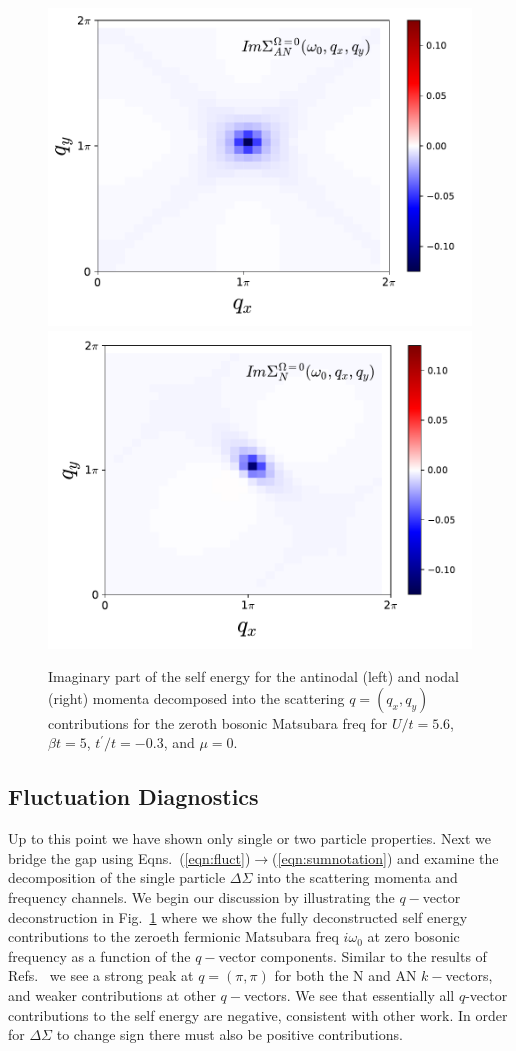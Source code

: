 \documentclass[twocolumn,notitlepage,prb,superscriptaddress,showpacs]{revtex4-1}
\begin{document}
\begin{figure}
\centering
    \includegraphics[width=0.68\linewidth]{c_mu_0_sigma_AN_nu1.pdf}
    \includegraphics[width=0.68\linewidth]{c_mu_0_sigma_node_nu1.pdf}
\caption{ Imaginary part of the self energy for the antinodal (left) and nodal (right) momenta decomposed into the scattering $q=(q_x,q_y)$ contributions for the zeroth bosonic Matsubara freq for $U/t=5.6$, $\beta t =5$, $t^\prime /t=-0.3$, and $\mu=0$.\label{fig:qxqyomega0} }
\end{figure} 

\subsection{Fluctuation Diagnostics}
Up to this point we have shown only single or two particle properties.  Next we bridge the gap using Eqns.~(\ref{eqn:fluct})$\to$(\ref{eqn:sumnotation}) and examine the decomposition of the single particle $\Delta\Sigma$ into the scattering momenta and frequency channels.
We begin our discussion by illustrating  the $q-$vector deconstruction in Fig.~\ref{fig:qxqyomega0} where we show the fully deconstructed self energy contributions to the zeroeth fermionic Matsubara freq $i\omega_0$ at zero bosonic frequency as a function of the $q-$vector components. 
Similar to the results of Refs.~ we see a strong peak at $q=(\pi,\pi)$ for both the N and AN $k-$vectors, and weaker contributions at other $q-$vectors.  
We see that essentially all $q$-vector contributions to the self energy are negative, consistent with other work.\cite{andergassen:2019,gunnarsson:2015}
In order for $\Delta \Sigma$ to change sign there must also be positive contributions.
\end{document}
